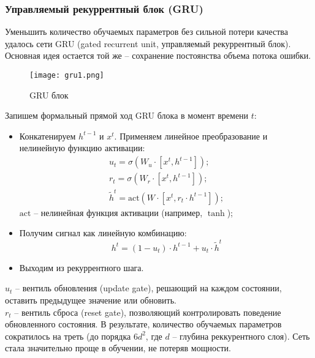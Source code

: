 \subsubsection{Управляемый рекуррентный блок (GRU)}
Уменьшить количество обучаемых параметров без сильной потери качества удалось сети GRU (gated recurrent unit, управляемый рекуррентный блок). Основная идея остается той же -- сохранение постоянства объема потока ошибки.
\begin{figure}[H]
    \centering
    \texttt{[image: gru1.png]}
    \label{gru1}
    \caption{GRU блок}
\end{figure}

\bigskip\par
Запишем формальный прямой ход GRU блока в момент времени $t$:\\
\begin{itemize}
    \item Конкатенируем $h^{t-1}$ и $x^{t}$. Применяем линейное преобразование и нелинейную функцию активации:
    \begin{gather*}
        u_{t} = \sigma \left(W_{u} \cdot\left[x^{t}, h^{t-1}\right]\right);\\
        r_{t} = \sigma\left(W_{r} \cdot \left[x^{t}, h^{t-1}\right]\right);\\
        \tilde{h}^{t} = \mathrm{act} \left(W \cdot \left[x^{t}, r_{t} \cdot h^{t-1}\right]\right);
    \end{gather*}
    $\mathrm{act}$ -- нелинейная функция активации (например, $\tanh$);
    \item Получим сигнал как линейную комбинацию:
    \[h^{t} = \left(1 - u_{t}\right)\cdot h^{t-1} + u_{t} \cdot \tilde{h}^{t}\]
    \item Выходим из рекуррентного шага.
\end{itemize}
$u_{t}$ -- вентиль обновления (update gate), решающий на каждом состоянии, оставить предыдущее значение или обновить.\\
$r_{t}$ -- вентиль сброса (reset gate), позволяющий контролировать поведение обновленного состояния. В результате, количество обучаемых параметров сократилось на треть (до порядка $6d^{2}$, где $d$ -- глубина реккурентного слоя). Сеть стала значительно проще в обучении, не потеряв мощности.
